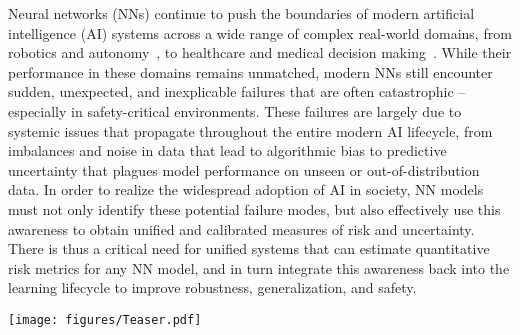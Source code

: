 \documentclass{article} %
\def\Capsa{\texttt{{Capsa}}}
\begin{document}
Neural networks (NNs) continue to push the boundaries of modern artificial intelligence (AI) systems across a wide range of complex real-world domains, from robotics and autonomy~\citep{bojarski2016end, hawke2020urban, codevilla2018end}, to healthcare and medical decision making~\citep{ching2018opportunities, topol2019high}. While their performance in these domains remains unmatched, modern NNs still encounter sudden, unexpected, and inexplicable failures that are often catastrophic -- especially in safety-critical environments. These failures are largely due to systemic issues that propagate throughout the entire modern AI lifecycle, from imbalances \citep{he2009learning, buda2018systematic} and noise \citep{beigman2009learning} in data that lead to algorithmic bias \citep{bolukbasi2016man,caliskan2017semantics, buolamwini2018gender,chen2018my, obermeyer2019dissecting, seyyed2021underdiagnosis} to predictive uncertainty \citep{kendall2017uncertainties, kompa2021second, nado2021uncertainty, amini2020deep} that plagues model performance on unseen or out-of-distribution data. In order to realize the widespread adoption of AI in society, NN models must not only identify these potential failure modes, but also effectively use this awareness to obtain unified and calibrated measures of risk and uncertainty. There is thus a critical need for unified systems that can estimate quantitative risk metrics for any NN model, and in turn integrate this awareness back into the learning lifecycle to improve robustness, generalization, and safety.

\begin{figure*}[t!]
\vspace{-10pt}
\centering
\texttt{[image: figures/Teaser.pdf]}
\caption{\textbf{\Capsa}~ unifies state-of-the-art algorithms for quantifying neural network risks ranging from (A) under-representation bias, (B) epistemic (model) uncertainty, and (C) aleatoric uncertainty (label noise). \Capsa~ converts existing models into risk-aware variants, capable of identifying risks efficiently during training and deployment. }
\vspace{-10pt}
\end{figure*}
\end{document}
